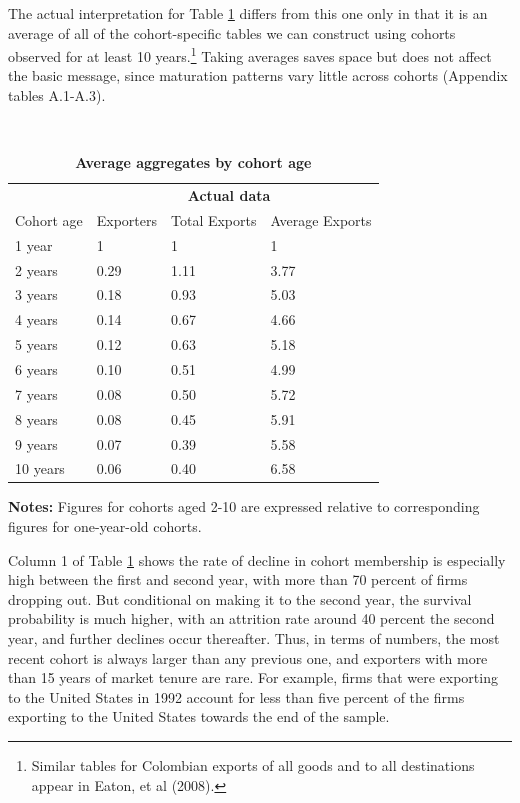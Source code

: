 \documentclass[12pt]{article}
\begin{document}
The actual interpretation for Table \ref{tab:Brooks} differs from this one
only in that it is an average of all of the cohort-specific tables we can
construct using cohorts observed for at least 10 years.\footnote{%
Similar tables for Colombian exports of all goods and to all destinations
appear in Eaton, et al (2008).\medskip \medskip} Taking averages saves space
but does not affect the basic message, since maturation patterns vary little
across cohorts (Appendix tables A.1-A.3). 
\begin{table}[tbp]
\caption{\textbf{Average aggregates by cohort age}}
\label{tab:Brooks}\centering
{\small \ }
\par
{\small 
\begin{tabular}{llll}
\hline\hline
& \multicolumn{3}{l}{\ \ \ \ \ \ \ \ \ \ \ \ \ \textbf{Actual data}} \\ 
\cline{2-4}
Cohort age & Exporters & Total Exports & Average Exports \\ \hline
1 year & 1 & 1 & 1 \\ 
2 years & 0.29 & 1.11 & 3.77 \\ 
3 years & 0.18 & 0.93 & 5.03 \\ 
4 years & 0.14 & 0.67 & 4.66 \\ 
5 years & 0.12 & 0.63 & 5.18 \\ 
6 years & 0.10 & 0.51 & 4.99 \\ 
7 years & 0.08 & 0.50 & 5.72 \\ 
8 years & 0.08 & 0.45 & 5.91 \\ 
9 years & 0.07 & 0.39 & 5.58 \\ 
10 years & 0.06 & 0.40 & 6.58 \\ \hline
\end{tabular}
}
\par
{\endcenter
\begin{tablenotes}
\item \textbf{Notes:} Figures for cohorts aged 2-10 are expressed relative to corresponding figures for one-year-old cohorts. 
\end{tablenotes}
}
\end{table}

Column 1 of Table \ref{tab:Brooks} shows the rate of decline in cohort
membership is especially high between the first and second year, with more
than 70 percent of firms dropping out. But conditional on making it to the
second year, the survival probability is much higher, with an attrition rate
around 40 percent the second year, and further declines occur thereafter.
Thus, in terms of numbers, the most recent cohort is always larger than any
previous one, and exporters with more than 15 years of market tenure are
rare. For example, firms that were exporting to the United States in 1992
account for less than five percent of the firms exporting to the United
States towards the end of the sample.
\end{document}
